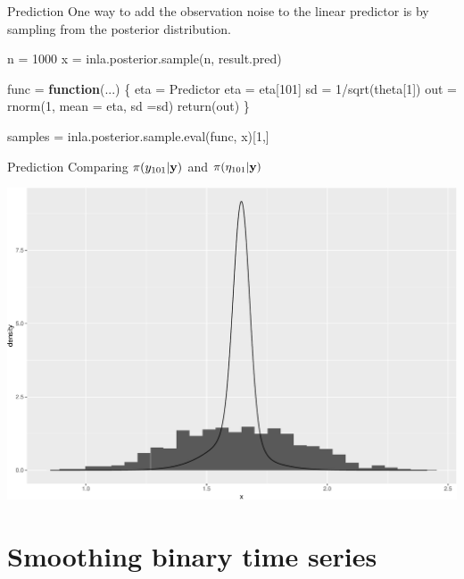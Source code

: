 \documentclass[
  handout]{beamer}
\newenvironment{Shaded}{\begin{snugshade}}{\end{snugshade}}
\newcommand{\AttributeTok}[1]{\textcolor[rgb]{0.77,0.63,0.00}{#1}}
\newcommand{\ControlFlowTok}[1]{\textcolor[rgb]{0.13,0.29,0.53}{\textbf{#1}}}
\newcommand{\DecValTok}[1]{\textcolor[rgb]{0.00,0.00,0.81}{#1}}
\newcommand{\FunctionTok}[1]{\textcolor[rgb]{0.00,0.00,0.00}{#1}}
\newcommand{\NormalTok}[1]{#1}
\newcommand{\OtherTok}[1]{\textcolor[rgb]{0.56,0.35,0.01}{#1}}
\newcommand{\SpecialCharTok}[1]{\textcolor[rgb]{0.00,0.00,0.00}{#1}}
\begin{document}
\begin{frame}[fragile]{Prediction}
\protect\hypertarget{prediction-4}{}
One way to add the observation noise to the linear predictor is by
sampling from the posterior distribution.

\small

\begin{Shaded}
\begin{Highlighting}[]
\NormalTok{n }\OtherTok{=} \DecValTok{1000}
\NormalTok{x }\OtherTok{=} \FunctionTok{inla.posterior.sample}\NormalTok{(n, result.pred)}

\NormalTok{func }\OtherTok{=} \ControlFlowTok{function}\NormalTok{(...)}
\NormalTok{\{}
\NormalTok{  eta }\OtherTok{=}\NormalTok{ Predictor}
\NormalTok{  eta }\OtherTok{=}\NormalTok{ eta[}\DecValTok{101}\NormalTok{]}
\NormalTok{  sd }\OtherTok{=} \DecValTok{1}\SpecialCharTok{/}\FunctionTok{sqrt}\NormalTok{(theta[}\DecValTok{1}\NormalTok{])}
\NormalTok{  out }\OtherTok{=} \FunctionTok{rnorm}\NormalTok{(}\DecValTok{1}\NormalTok{, }\AttributeTok{mean =}\NormalTok{ eta, }\AttributeTok{sd =}\NormalTok{sd)}
  \FunctionTok{return}\NormalTok{(out)}
\NormalTok{\}}

\NormalTok{samples }\OtherTok{=} \FunctionTok{inla.posterior.sample.eval}\NormalTok{(func, x)[}\DecValTok{1}\NormalTok{,]}
\end{Highlighting}
\end{Shaded}
\end{frame}

\begin{frame}{Prediction}
\protect\hypertarget{prediction-5}{}
Comparing \(\pi(y_{101}|\bf{y})\) and \(\pi(\eta_{101}|\bf{y})\)

\begin{center}\includegraphics[width=0.6\linewidth]{Part2_RINLA_files/figure-beamer/unnamed-chunk-37-1} \end{center}
\normalsize
\end{frame}

\hypertarget{smoothing-binary-time-series}{%
\section{Smoothing binary time
series}\label{smoothing-binary-time-series}}
\end{document}
